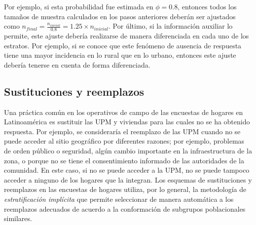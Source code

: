 \documentclass[
  12pt,
  spanish,
]{book}
\begin{document}
Por ejemplo, si esta probabilidad fue estimada en \(\phi = 0.8\), entonces todos los tamaños de muestra calculados en los pasos anteriores deberán ser ajustados como \(n_{final} = \frac{n_{inicial}}{0.8} = 1.25\times n_{inicial}\). Por último, si la información auxiliar lo permite, este ajuste debería realizarse de manera diferenciada en cada uno de los estratos. Por ejemplo, si se conoce que este fenómeno de ausencia de respuesta tiene una mayor incidencia en lo rural que en lo urbano, entonces este ajuste debería tenerse en cuenta de forma diferenciada.

\hypertarget{sustituciones-y-reemplazos}{%
\subsection{Sustituciones y reemplazos}\label{sustituciones-y-reemplazos}}

Una práctica común en los operativos de campo de las encuestas de hogares en Latinoamérica es sustituir las UPM y viviendas para las cuales no se ha obtenido respuesta. Por ejemplo, se consideraría el reemplazo de las UPM cuando no se puede acceder al sitio geográfico por diferentes razones; por ejemplo, problemas de orden público o seguridad, algún cambio importante en la infraestructura de la zona, o porque no se tiene el consentimiento informado de las autoridades de la comunidad. En este caso, si no se puede acceder a la UPM, no se puede tampoco acceder a ninguno de los hogares que la integran. Los esquemas de sustituciones y reemplazos en las encuestas de hogares utiliza, por lo general, la metodología de \emph{estratificación implícita} que permite seleccionar de manera automática a los reemplazos adecuados de acuerdo a la conformación de subgrupos poblacionales similares.
\end{document}
